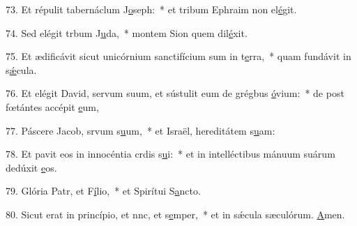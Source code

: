 73. Et répulit tabernáclum J\uline{o}seph:~* et tribum Ephraim non el\uline{é}git.\par 
74. Sed elégit trbum J\uline{u}da,~* montem Sion quem dil\uline{é}xit.\par 
75. Et ædificávit sicut unicórnium sanctifícium sum in t\uline{e}rra,~* quam fundávit in s\uline{ǽ}cula.\par 
76. Et elégit David, servum suum, et sústulit eum de grégbus \uline{ó}vium:~* de post fœtántes accépit \uline{e}um,\par 
77. Páscere Jacob, srvum s\uline{u}um,~* et Israël, hereditátem s\uline{u}am:\par 
78. Et pavit eos in innocéntia crdis s\uline{u}i:~* et in intelléctibus mánuum suárum dedúxit \uline{e}os.\par 
79. Glória Patr, et F\uline{í}lio,~* et Spirítui S\uline{a}ncto.\par 
80. Sicut erat in princípio, et nnc, et s\uline{e}mper,~* et in sǽcula sæculórum. \uline{A}men.\par 
